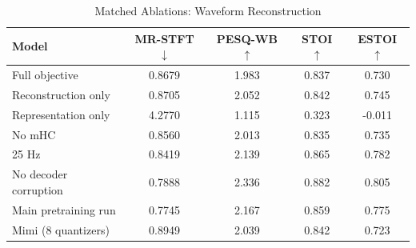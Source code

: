 \begin{table}[htbp]
  \centering
  \caption{Matched Ablations: Waveform Reconstruction}
  \label{tab:ablation_recon}
  \renewcommand{\arraystretch}{1.3}
  \begin{tabular}{l c c c c}
    \toprule
    \textbf{Model} & \textbf{MR-STFT $\downarrow$} & \textbf{PESQ-WB $\uparrow$} & \textbf{STOI $\uparrow$} & \textbf{ESTOI $\uparrow$} \\
    \midrule
    Full objective & 0.8679 & 1.983 & 0.837 & 0.730 \\
    Reconstruction only & 0.8705 & 2.052 & 0.842 & 0.745 \\
    Representation only & 4.2770 & 1.115 & 0.323 & -0.011 \\
    No mHC & 0.8560 & 2.013 & 0.835 & 0.735 \\
    25 Hz & 0.8419 & 2.139 & 0.865 & 0.782 \\
    No decoder corruption & 0.7888 & 2.336 & 0.882 & 0.805 \\
    \midrule
    Main pretraining run & 0.7745 & 2.167 & 0.859 & 0.775 \\
    Mimi (8 quantizers) & 0.8949 & 2.039 & 0.842 & 0.723 \\
    \bottomrule
  \end{tabular}
\end{table}

\begin{table}[htbp]
  \centering
  \caption{Matched Ablations: Frozen-Feature Evaluation (\%)}
  \label{tab:ablation_frozen}
  \renewcommand{\arraystretch}{1.3}
\end{table}

